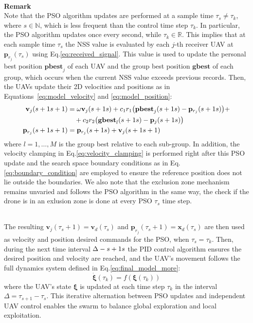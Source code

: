 \documentclass[main]{subfiles}
\begin{document}
\noindent\\
\textbf{Remark}\noindent\\
Note that the PSO algorithm updates are performed at a sample time 
$\tau_s \neq \tau_k$, where $s \in \mathbb{N}$, which is less 
frequent than the control time step $\tau_k$.
In particular, the PSO algorithm updates once every second, while 
$\tau_k \in \mathbb{R}$.
This implies that at each sample time $\tau_s$ the NSS value is 
evaluated by each $j$-th receiver UAV at $\mathbf{p}_{r_j}(\tau_s)$ using 
Eq.\ref{eq:received_signal}.
This value is used to update the personal best position $\mathbf{pbest}_{j}$
of each UAV and the group best position $\mathbf{gbest}$ of each group,
which occurs when the current NSS value exceeds previous records. 
Then, the UAVs update their 2D velocities and positions
as in Equations~\ref{eq:model_velocity} and \ref{eq:model_position}:
\begin{align}
 \mathbf{v}_{j}(\tau_s+1) &= \omega \mathbf{v}_{j}(\tau_s) 
 + c_1 r_1 \big(\mathbf{pbest}_{j}(\tau_s) - \mathbf{p}_{r_j}(\tau_s)\big) + \notag \\
    &\quad + c_2 r_2 \big(\mathbf{gbest}_l(\tau_s) - \mathbf{p}_{j}(\tau_s)\big) \label{eq:model_velocity2} \\
 \mathbf{p}_{r_j}(\tau_s + 1) &= \mathbf{p}_{r_j}(\tau_s) + \mathbf{v}_{j}(\tau_s+1) \label{eq:model_position2}
\end{align}
where $l = 1, \ldots, M$ is the group best relative to each sub-group.
In addition, the velocity clamping in Eq.\ref{eq:velocity_clamping} is performed right after
this PSO update and the search space boundary conditions as in
Eq.\ref{eq:boundary_condition} are employed to ensure the reference position does not lie outside the boundaries.
We also note that the exclusion zone mechanism remains unvaried
and follows the PSO algorithm in the same way, the check if the drone is in an exlusion zone is done at every PSO $\tau_s$
time step.

\noindent\\
The resulting $\mathbf{v}_{j}(\tau_s+1) = \mathbf{v}_d(\tau_s)$ and $\mathbf{p}_{r_j}(\tau_s + 1) = \mathbf{x}_d(\tau_s)$
are then used as velocity and position desired commands for the PSO, when 
$\tau_s = \tau_k$.
Then, during the next time interval $\Delta \def \tau_{s+1} - \tau_s$ the PID
control algorithm ensures the desired position and velocity are reached,
and the UAV's movement follows the full dynamics system defined in 
Eq.\ref{eq:final_model_more}:
\begin{equation}
 \dot{\mathbf{\xi}}(\tau_k) = f(\mathbf{\xi}(\tau_k))
\end{equation}
where the UAV’s state $\mathbf{\xi}$ is updated at each time step $\tau_k$ in the 
interval $\Delta = \tau_{s+1} - \tau_s$.
This iterative alternation between PSO updates and 
independent UAV 
control enables the swarm to balance global 
exploration and local exploitation.
\end{document}
